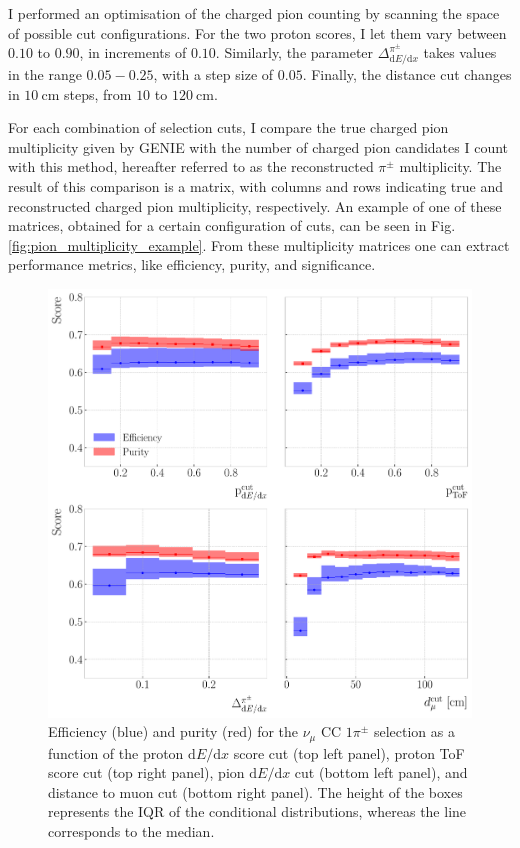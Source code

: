 I performed an optimisation of the charged pion counting by scanning the space of possible cut configurations. For the two proton scores, I let them vary between $0.10$ to $0.90$, in increments of $0.10$. Similarly, the parameter $\Delta^{\pi^{\pm}}_{\mathrm{d}E/\mathrm{d}x}$ takes values in the range $0.05-0.25$, with a step size of $0.05$. Finally, the distance cut changes in $10~\mathrm{cm}$ steps, from $10$ to $120~\mathrm{cm}$.

For each combination of selection cuts, I compare the true charged pion multiplicity given by GENIE with the number of charged pion candidates I count with this method, hereafter referred to as the reconstructed $\pi^{\pm}$ multiplicity. The result of this comparison is a matrix, with columns and rows indicating true and reconstructed charged pion multiplicity, respectively. An example of one of these matrices, obtained for a certain configuration of cuts, can be seen in Fig. \ref{fig:pion_multiplicity_example}. From these multiplicity matrices one can extract performance metrics, like efficiency, purity, and significance.

\begin{figure}[t]
    \centering
    \includegraphics[width=.85\linewidth]{Images/GAr_selection/pion_selection_1_pions_metrics.pdf}
    \caption[Efficiency and purity for the $\nu_{\mu}$ CC $1\pi^{\pm}$ selection as a function of the different cuts.]{Efficiency (blue) and purity (red) for the $\nu_{\mu}$ CC $1\pi^{\pm}$ selection as a function of the proton $\mathrm{d}E/\mathrm{d}x$ score cut (top left panel), proton ToF score cut (top right panel), pion $\mathrm{d}E/\mathrm{d}x$ cut (bottom left panel), and distance to muon cut (bottom right panel). The height of the boxes represents the IQR of the conditional distributions, whereas the line corresponds to the median.}
    \label{fig:pion_selection_1_pions_metrics}
\end{figure}

